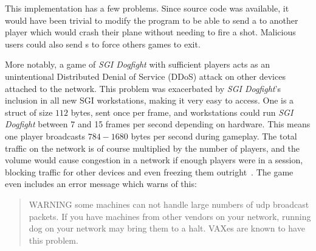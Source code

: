 This implementation has a few problems. Since source code was available, it would have been trivial to modify the program to be able to send a  to another player which would crash their plane without needing to fire a shot. Malicious users could also send s to force others games to exit.

More notably, a game of \textit{SGI Dogfight} with sufficient players acts as an unintentional Distributed Denial of Service (DDoS) attack on other devices attached to the network.
This problem was exacerbated by \textit{SGI Dogfight}'s inclusion in all new SGI workstations, making it very easy to access. One  is a struct of size $112$ bytes, sent once per frame, and workstations could run \textit{SGI Dogfight} between 7 and 15 frames per second depending on hardware. This means one player broadcasts $784-1680$ bytes per second during gameplay. The total traffic on the network is of course multiplied by the number of players, and the volume would cause congestion in a network if enough players were in a session, blocking traffic for other devices and even freezing them outright~\cite{mace}. The game even includes an error message which warns of this:

\begin{quote}
  WARNING some machines can not handle large numbers of udp
  broadcast packets. If you have machines from other vendors
  on your network, running dog on your network may bring them
  to a halt. VAXes are known to have this problem.
\end{quote}~\cite{dogsrc}
